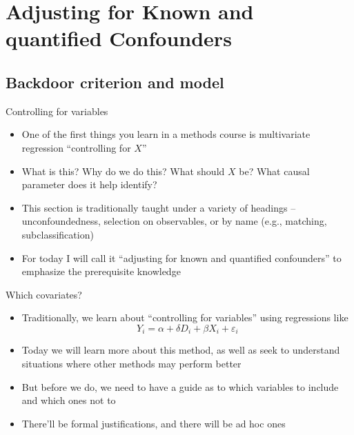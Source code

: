 \documentclass{beamer}
\begin{document}



\section{Adjusting for Known and quantified Confounders}

\subsection{Backdoor criterion and model}

\begin{frame}{Controlling for variables}

\begin{itemize}
\item One of the first things you learn in a methods course is multivariate regression ``controlling for $X$''
\item What is this? Why do we do this?  What should $X$ be? What causal parameter does it help identify?
\item This section is traditionally taught under a variety of headings -- unconfoundedness, selection on observables, or by name (e.g., matching, subclassification)
\item For today I will call it ``adjusting for known and quantified confounders'' to emphasize the prerequisite knowledge
\end{itemize}

\end{frame}

\begin{frame}{Which covariates?}

\begin{itemize}

\item Traditionally, we learn about ``controlling for variables'' using regressions like $$Y_i = \alpha + \delta D_i + \beta X_i + \varepsilon_i$$
\item Today we will learn more about this method, as well as seek to understand situations where other methods may perform better
\item But before we do, we need to have a guide as to which variables to include and which ones not to
\item There'll be formal justifications, and there will be ad hoc ones

\end{itemize}

\end{frame}
\end{document}

